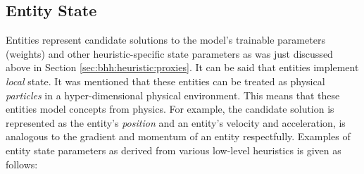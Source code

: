 \subsection{Entity State}
\label{sec:bhh:entity_pool:entity_state}

Entities represent candidate solutions to the model's trainable parameters (weights) and other heuristic-specific state parameters as was just discussed above in Section \ref{sec:bhh:heuristic:proxies}. It can be said that entities implement \textit{local} state. It was mentioned that these entities can be treated as physical \textit{particles} in a hyper-dimensional physical environment. This means that these entities model concepts from physics. For example, the candidate solution is represented as the entity's \textit{position} and an entity's velocity and acceleration, is analogous to the gradient and momentum of an entity respectfully. Examples of entity state parameters as derived from various low-level heuristics is given as follows:

